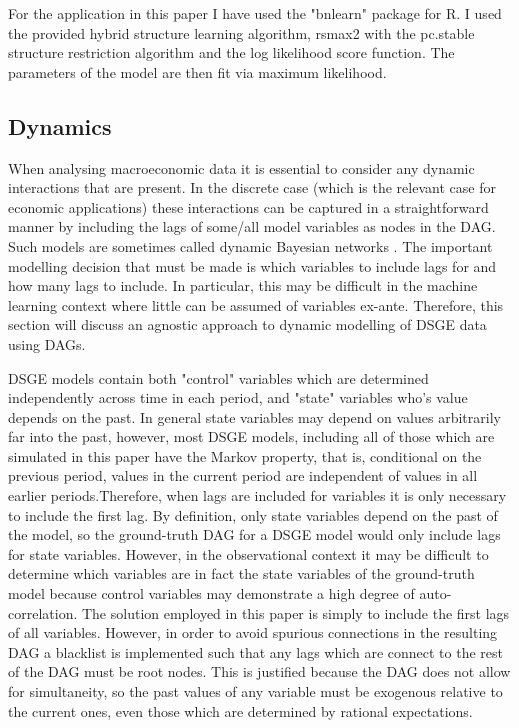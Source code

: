 \documentclass{article}
\begin{document}
For the application in this paper I have used the "bnlearn" package \parencite{scutari2010bnlearn} for R. I used the provided hybrid structure learning algorithm, rsmax2 with the pc.stable structure restriction algorithm and the log likelihood score function. The parameters of the model are then fit via maximum likelihood. 

\subsection{Dynamics} \label{dynamics}

When analysing macroeconomic data it is essential to consider any dynamic interactions that are present. In the discrete case (which is the relevant case for economic applications) these interactions can be captured in a straightforward manner by including the lags of some/all model variables as nodes in the DAG. Such models are sometimes called dynamic Bayesian networks \cite{ghahramani1997learning}. The important modelling decision that must be made is which variables to include lags for and how many lags to include. In particular, this may be difficult in the machine learning context where little can be assumed of variables ex-ante. Therefore, this section will discuss an agnostic approach to dynamic modelling of DSGE data using DAGs.

DSGE models contain both "control" variables which are determined independently across time in each period, and "state" variables who's value depends on the past. In general state variables may depend on values arbitrarily far into the past, however, most DSGE models, including all of those which are simulated in this paper have the Markov property, that is, conditional on the previous period, values in the current period are independent of values in all earlier periods.Therefore, when lags are included for variables it is only necessary to include the first lag. By definition, only state variables depend on the past of the model, so the ground-truth DAG for a DSGE model would only include lags for state variables. However, in the observational context it may be difficult to determine which variables are in fact the state variables of the ground-truth model because control variables may demonstrate a high degree of auto-correlation. The solution employed in this paper is simply to include the first lags of all variables. However, in order to avoid spurious connections in the resulting DAG a blacklist is implemented such that any lags which are connect to the rest of the DAG must be root nodes. This is justified because the DAG does not allow for simultaneity, so the past values of any variable must be exogenous relative to the current ones, even those which are determined by rational expectations. 
\end{document}
